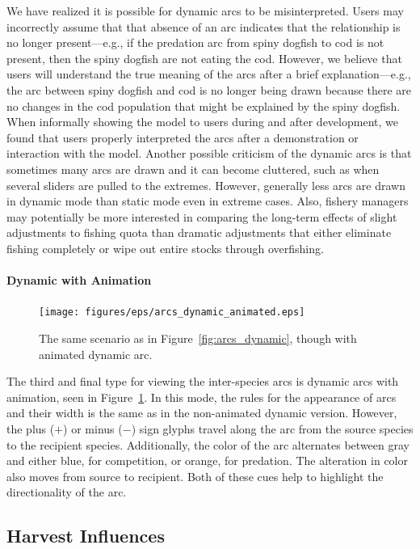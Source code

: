 We have realized it is possible for dynamic arcs to be misinterpreted.  Users may incorrectly assume that that absence of an arc indicates that the relationship is no longer present---e.g., if the predation arc from spiny dogfish to cod is not present, then the spiny dogfish are not eating the cod.  However, we believe that users will understand the true meaning of the arcs after a brief explanation---e.g., the arc between spiny dogfish and cod is no longer being drawn because there are no changes in the cod population that might be explained by the spiny dogfish.  When informally showing the model to users during and after development, we found that users properly interpreted the arcs after a demonstration or interaction with the model.  Another possible criticism of the dynamic arcs is that sometimes many arcs are drawn and it can become cluttered, such as when several sliders are pulled to the extremes.  However, generally less arcs are drawn in dynamic mode than static mode even in extreme cases.  Also, fishery managers may potentially be more interested in comparing the long-term effects of slight adjustments to fishing quota than dramatic adjustments that either eliminate fishing completely or wipe out entire stocks through overfishing.

\paragraph{Dynamic with Animation}

\begin{figure}[h]
	\centering
	\texttt{[image: figures/eps/arcs\_dynamic\_animated.eps]}
	\caption{The same scenario as in Figure~\ref{fig:arcs_dynamic}, though with animated dynamic arc.}
	\label{fig:arcs_dynamic_animated}
\end{figure}

The third and final type for viewing the inter-species arcs is dynamic arcs with animation, seen in Figure~\ref{fig:arcs_dynamic_animated}.  In this mode, the rules for the appearance of arcs and their width is the same as in the non-animated dynamic version.  However, the plus ($+$) or minus ($-$) sign glyphs travel along the arc from the source species to the recipient species.  Additionally, the color of the arc alternates between gray and either blue, for competition, or orange, for predation.  The alteration in color also moves from source to recipient.  Both of these cues help to highlight the directionality of the arc.

\subsection{Harvest Influences}

